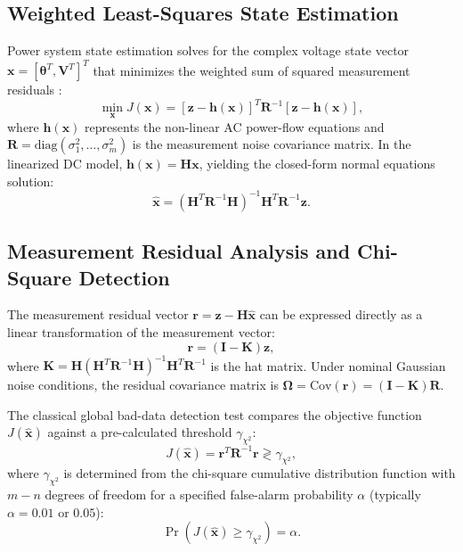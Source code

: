 \documentclass[12pt,a4paper]{report}
\begin{document}
\subsection{Weighted Least-Squares State Estimation}
Power system state estimation solves for the complex voltage state vector
$\boldsymbol{x} = [\boldsymbol{\theta}^T, \boldsymbol{V}^T]^T$ that minimizes the weighted
sum of squared measurement residuals \cite{abur2004}:
\begin{equation}
\min_{\boldsymbol{x}} J(\boldsymbol{x}) = [\boldsymbol{z} - \boldsymbol{h}(\boldsymbol{x})]^T \boldsymbol{R}^{-1} [\boldsymbol{z} - \boldsymbol{h}(\boldsymbol{x})],
\end{equation}
where $\boldsymbol{h}(\boldsymbol{x})$ represents the non-linear AC power-flow equations
and $\boldsymbol{R} = \text{diag}(\sigma_1^2, \dots, \sigma_m^2)$ is the measurement noise
covariance matrix. In the linearized DC model, $\boldsymbol{h}(\boldsymbol{x}) = \boldsymbol{H}\boldsymbol{x}$,
yielding the closed-form normal equations solution:
\begin{equation}
\hat{\boldsymbol{x}} = (\boldsymbol{H}^T \boldsymbol{R}^{-1} \boldsymbol{H})^{-1} \boldsymbol{H}^T \boldsymbol{R}^{-1} \boldsymbol{z}.
\label{eq:wls_solution}
\end{equation}

\subsection{Measurement Residual Analysis and Chi-Square Detection}
The measurement residual vector $\boldsymbol{r} = \boldsymbol{z} - \boldsymbol{H}\hat{\boldsymbol{x}}$
can be expressed directly as a linear transformation of the measurement vector:
\begin{equation}
\boldsymbol{r} = (\boldsymbol{I} - \boldsymbol{K})\boldsymbol{z},
\end{equation}
where $\boldsymbol{K} = \boldsymbol{H}(\boldsymbol{H}^T \boldsymbol{R}^{-1} \boldsymbol{H})^{-1} \boldsymbol{H}^T \boldsymbol{R}^{-1}$
is the hat matrix. Under nominal Gaussian noise conditions, the residual covariance matrix is
$\boldsymbol{\Omega} = \text{Cov}(\boldsymbol{r}) = (\boldsymbol{I} - \boldsymbol{K})\boldsymbol{R}$.

The classical global bad-data detection test compares the objective function $J(\hat{\boldsymbol{x}})$
against a pre-calculated threshold $\gamma_{\chi^2}$:
\begin{equation}
J(\hat{\boldsymbol{x}}) = \boldsymbol{r}^T \boldsymbol{R}^{-1} \boldsymbol{r} \gtrless \gamma_{\chi^2},
\label{eq:chi2_test}
\end{equation}
where $\gamma_{\chi^2}$ is determined from the chi-square cumulative distribution function
with $m - n$ degrees of freedom for a specified false-alarm probability $\alpha$ (typically $\alpha = 0.01$ or $0.05$):
\begin{equation}
\Pr(J(\hat{\boldsymbol{x}}) \ge \gamma_{\chi^2}) = \alpha.
\end{equation}
\end{document}

